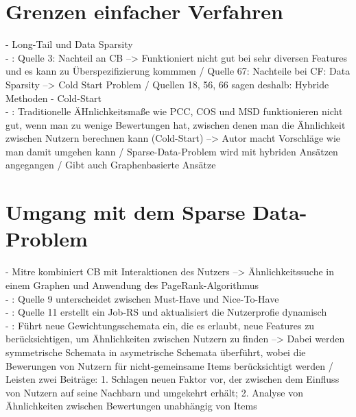 \section{Grenzen einfacher Verfahren}
\label{ch:standDerForschung:grenzen}
- Long-Tail \cite{mitre:2014} und Data Sparsity \\
- \cite{malinowski:2008}: Quelle 3: Nachteil an CB --> Funktioniert nicht gut bei sehr diversen Features und es kann zu Überspezifizierung kommmen / Quelle 67: Nachteile bei CF: Data Sparsity --> Cold Start Problem / Quellen 18, 56, 66 sagen deshalb: Hybride Methoden
- Cold-Start \\
- \cite{weightedSimilarity:2015}: Traditionelle ÄHnlichkeitsmaße wie PCC, COS und MSD funktionieren nicht gut, wenn man zu wenige Bewertungen hat, zwischen denen man die Ähnlichkeit zwischen Nutzern berechnen kann (Cold-Start) --> Autor macht Vorschläge wie man damit umgehen kann / Sparse-Data-Problem wird mit hybriden Ansätzen angegangen / Gibt auch Graphenbasierte Ansätze

\section{Umgang mit dem Sparse Data-Problem}
\label{ch:standDerForschung:sparseData}
- Mitre kombiniert CB mit Interaktionen des Nutzers --> Ähnlichkeitssuche in einem Graphen und Anwendung des PageRank-Algorithmus \cite{mitre:2014} \\
- \cite{enhancingERecruitment:2012}: Quelle 9 unterscheidet zwischen Must-Have und Nice-To-Have \\
- \cite{buildingVectorRepresentations:2020}: Quelle 11 erstellt ein Job-RS und aktualisiert die Nutzerprofie dynamisch \\
- \cite{weightedSimilarity:2015}: Führt neue Gewichtungsschemata ein, die es erlaubt, neue Features zu berücksichtigen, um Ähnlichkeiten zwischen Nutzern zu finden --> Dabei werden symmetrische Schemata in asymetrische Schemata überführt, wobei die Bewerungen von Nutzern für nicht-gemeinsame Items berücksichtigt werden / Leisten zwei Beiträge: 1. Schlagen neuen Faktor vor, der zwischen dem Einfluss von Nutzern auf seine Nachbarn und umgekehrt erhält; 2. Analyse von Ähnlichkeiten zwischen Bewertungen unabhängig von Items

